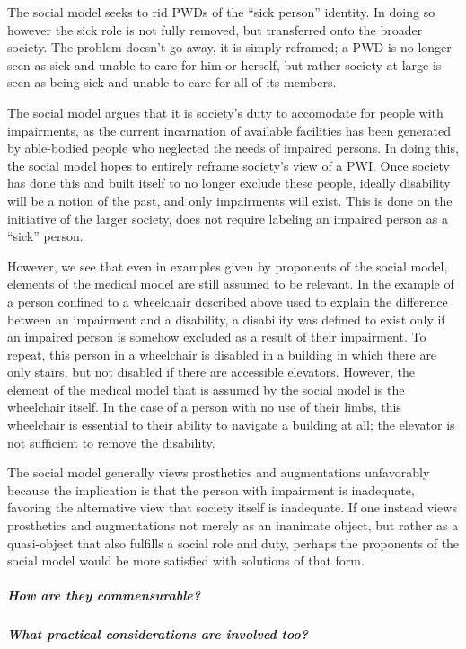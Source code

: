 \documentclass[a4paper]{article}
\begin{document}
The social model seeks to rid PWDs of the ``sick person'' identity. In doing
so however the sick role is not fully removed, but transferred onto the
broader society. The problem doesn’t go away, it is simply reframed; a PWD is
no longer seen as sick and unable to care for him or herself, but rather
society at large is seen as being sick and unable to care for all of its
members.

The social model argues that it is society's duty to accomodate for people
with impairments, as the current incarnation of available facilities has been
generated by able-bodied people who neglected the needs of impaired persons.
In doing this, the social model hopes to entirely reframe society's view of a
PWI. Once society has done this and built itself to no longer exclude these
people, ideally disability will be a notion of the past, and only impairments
will exist. This is done on the initiative of the larger society, does not
require labeling an impaired person as a ``sick'' person.

However, we see that even in examples given by proponents of the social model,
elements of the medical model are still assumed to be relevant.  In the
example of a person confined to a wheelchair described above used to explain
the difference between an impairment and a disability, a disability was
defined to exist only if an impaired person is somehow excluded as a result of
their impairment. To repeat, this person in a wheelchair is disabled in a
building in which there are only stairs, but not disabled if there are
accessible elevators. However, the element of the medical model that is
assumed by the social model is the wheelchair itself. In the case of a person
with no use of their limbs, this wheelchair is essential to their ability
to navigate a building at all; the elevator is not sufficient to remove the
disability. 

The social model generally views prosthetics and augmentations
unfavorably because the implication is that the person with impairment is
inadequate, favoring the alternative view that society itself is inadequate.
If one instead views prosthetics and augmentations not merely as an inanimate
object, but rather as a quasi-object that also fulfills a social role and
duty, perhaps the proponents of the social model would be more satisfied with
solutions of that form.

\subparagraph{How are they commensurable?}

\subparagraph{What practical considerations are involved too?}
\end{document}

